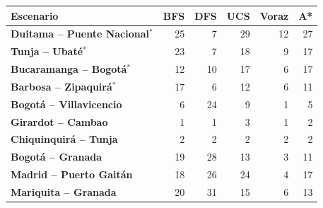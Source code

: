 \renewcommand{\arraystretch}{1.2}
\begin{tabular}{|l|r|r|r|r|r|}
\hline
\rowcolor{gray!20} \textbf{Escenario} & \textbf{BFS} & \textbf{DFS} & \textbf{UCS} & \textbf{Voraz} & \textbf{A*} \\
\hline
\textbf{Duitama -- Puente Nacional$^{*}$} & 25 & 7 & 29 & 12 & 27 \\
\hline
\textbf{Tunja -- Ubaté$^{*}$} & 23 & 7 & 18 & 9 & 17 \\
\hline
\textbf{Bucaramanga -- Bogotá$^{*}$} & 12 & 10 & 17 & 6 & 17 \\
\hline
\textbf{Barbosa -- Zipaquirá$^{*}$} & 17 & 6 & 12 & 6 & 11 \\
\hline
\textbf{Bogotá -- Villavicencio} & 6 & 24 & 9 & 1 & 5 \\
\hline
\textbf{Girardot -- Cambao} & 1 & 1 & 3 & 1 & 2 \\
\hline
\textbf{Chiquinquirá -- Tunja} & 2 & 2 & 2 & 2 & 2 \\
\hline
\textbf{Bogotá -- Granada} & 19 & 28 & 13 & 3 & 11 \\
\hline
\textbf{Madrid -- Puerto Gaitán} & 18 & 26 & 24 & 4 & 17 \\
\hline
\textbf{Mariquita -- Granada} & 20 & 31 & 15 & 6 & 13 \\
\hline
\end{tabular}
